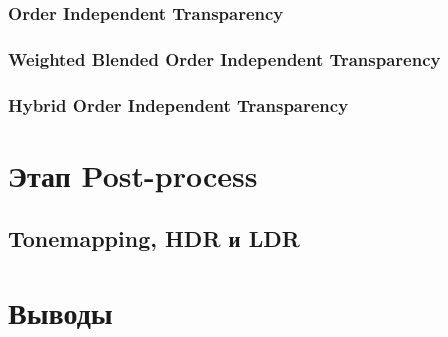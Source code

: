 		\subsubsection{Order Independent Transparency} \label{ch3:render_pass:transparents:oit}
		\subsubsection{Weighted Blended Order Independent Transparency} \label{ch3:render_pass:transparents:wboit}
		\subsubsection{Hybrid Order Independent Transparency} \label{ch3:render_pass:transparents:hybrid_oit}
\section{Этап Post-process} \label{ch3:post_process}
	\subsection{Tonemapping, HDR и LDR} \label{ch3:post_process:hdr_ldr_tonemapping}
\section{Выводы} \label{ch3:conclusion}

%
